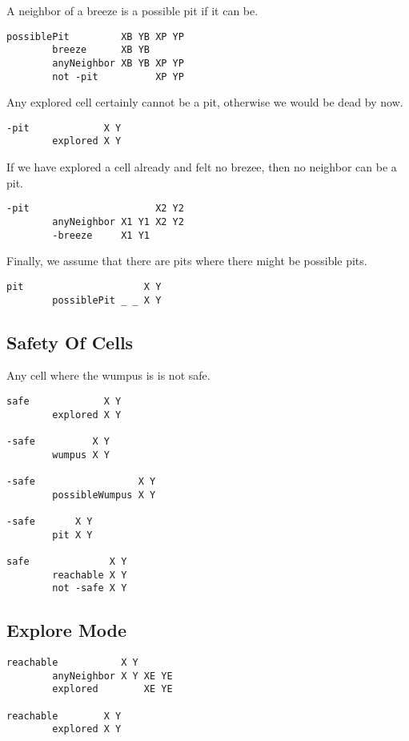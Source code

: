 A neighbor of a breeze is a possible pit if it can be.

\begin{verbatim}
possiblePit         XB YB XP YP
        breeze      XB YB
        anyNeighbor XB YB XP YP
        not -pit          XP YP
\end{verbatim}

Any explored cell certainly cannot be a pit, otherwise we would be dead
by now.

\begin{verbatim}
-pit             X Y
        explored X Y
\end{verbatim}

If we have explored a cell already and felt no brezee, then no neighbor
can be a pit.

\begin{verbatim}
-pit                      X2 Y2
        anyNeighbor X1 Y1 X2 Y2
        -breeze     X1 Y1
\end{verbatim}

Finally, we assume that there are pits where there might be possible
pits.

\begin{verbatim}
pit                     X Y
        possiblePit _ _ X Y
\end{verbatim}

\hypertarget{safety-of-cells}{%
\subsection{Safety Of Cells}\label{safety-of-cells}}

Any cell where the wumpus is is not safe.

\begin{verbatim}
safe             X Y
        explored X Y

-safe          X Y
        wumpus X Y

-safe                  X Y
        possibleWumpus X Y

-safe       X Y
        pit X Y

safe              X Y
        reachable X Y
        not -safe X Y
\end{verbatim}

\hypertarget{explore-mode}{%
\subsection{Explore Mode}\label{explore-mode}}

\begin{verbatim}
reachable           X Y
        anyNeighbor X Y XE YE
        explored        XE YE

reachable        X Y
        explored X Y
\end{verbatim}

